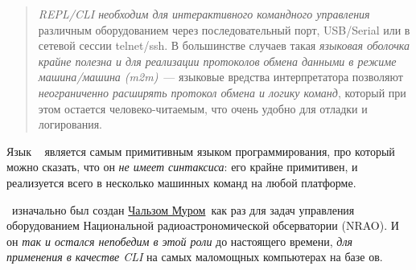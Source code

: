 \begin{quotation}\noindent
\emph{REPL/CLI необходим для интерактивного командного управления} различным
оборудованием через последовательный порт, USB/Serial или в сетевой сессии
telnet/ssh. В большинстве случаев такая \emph{языковая оболочка крайне полезна и
для реализации протоколов обмена данными в режиме машина/машина (m2m)}\ ---
языковые вредства интерпретатора позволяют \emph{неограниченно расширять
протокол обмена и логику команд}, который при этом остается человеко-читаемым,
что очень удобно для отладки и логирования.
\end{quotation}

\clearpage
\noindent
Язык \F\ \cite{starting} является самым примитивным языком программирования, про
который можно сказать, что он \textit{не имеет синтаксиса}: его 
крайне примитивен, и реализуется всего в несколько машинных команд на любой
платформе.

\F\ изначально был создан
\href{https://ru.wikipedia.org/wiki/%D0%9C%D1%83%D1%80,\_%D0%A7%D0%B0%D1%80%D0%BB%D1%8C%D0%B7\_(%D0%BF%D1%80%D0%BE%D0%B3%D1%80%D0%B0%D0%BC%D0%BC%D0%B8%D1%81%D1%82)}{Чальзом
Муром}\ как раз для задач управления оборудованием Национальной
радиоастрономической обсерватории (NRAO). И он \textit{так и остался непобедим в
этой роли} до настоящего времени, \textit{для применения в качестве CLI} на
самых маломощных компьютерах на базе ов.

\secup
